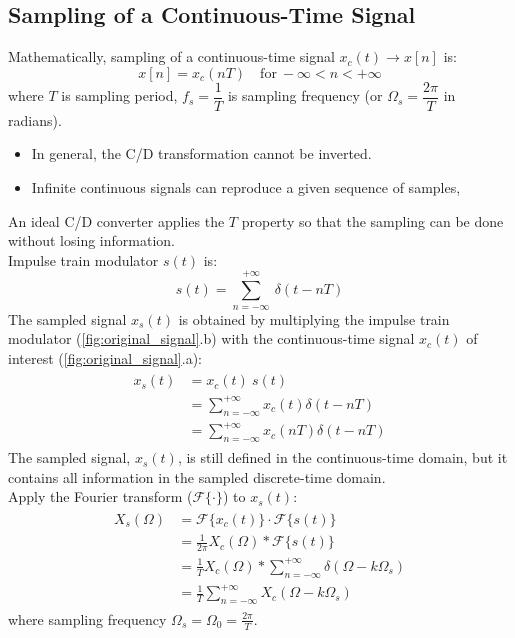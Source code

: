 \subsection{Sampling of a Continuous-Time Signal}
Mathematically, sampling of a continuous-time signal $x_{c}(t) \to x[n]$ is:
\[ x[n] = x_{c}(nT) \quad \text{for} \ -\infty < n < +\infty \]
where $T$ is sampling period, $f_{s} = \dfrac{1}{T}$ is sampling frequency (or $\Omega_{s}=\dfrac{2\pi}{T}$ in radians). 
\begin{itemize}
    \item In general, the C/D transformation cannot be inverted.
    \item Infinite continuous signals can reproduce a given sequence of samples,
\end{itemize}
An ideal C/D converter applies the $T$ property so that the sampling can be done without losing information. \\


Impulse train modulator $s(t)$ is: 
\[ 
    s(t) = \sum_{n=-\infty}^{+\infty} \ \delta(t-nT) 
\]
The sampled signal $x_{s}(t)$ is obtained by multiplying the impulse train modulator (\autoref{fig:original_signal}.b) with the continuous-time signal $x_{c}(t)$ of interest (\autoref{fig:original_signal}.a):
\begin{align*} 
\begin{split}
x_{s}(t) &= x_{c}(t) \ s(t)\\
&= \sum_{n=-\infty}^{+\infty} x_{c}(t) \delta(t-nT)\\
&= \sum_{n=-\infty}^{+\infty} x_{c}(nT) \delta(t-nT)
\end{split}
\end{align*}
The sampled signal, $x_{s}(t)$, is still defined in the continuous-time domain, but it contains all information in the sampled discrete-time domain.\\

Apply the Fourier transform ($\mathcal{F}\{\cdot\}$) to $x_{s}(t)$:
\begin{align*} 
\begin{split}
    X_{s}(\Omega) 
    & = \mathcal{F}\{x_{c}(t)\} \cdot \mathcal{F}\{s(t)\}\\
    & = \frac{1}{2\pi} X_{c}(\Omega) * \mathcal{F}\{s(t)\} \\
    & = \frac{1}{T} X_{c}(\Omega) * \sum_{n=-\infty}^{+\infty} \delta (\Omega - k \Omega_{s})\\
    & = \boxed{\frac{1}{T} \sum_{n=-\infty}^{+\infty}  X_{c}(\Omega - k \Omega_{s})}
\end{split} 
\end{align*}
where sampling frequency $\Omega_{s}=\Omega_{0}=\frac{2\pi}{T}$.

